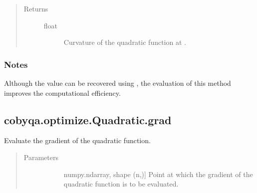 \documentclass[letterpaper,10pt,english]{sphinxmanual}
\begin{document}
\begin{fulllineitems}
\begin{fulllineitems}
\begin{quote}
\begin{description}
\begin{description}
\end{description}

\item[{Returns}] \leavevmode\begin{description}
\item[{float}] \leavevmode
\sphinxAtStartPar
Curvature of the quadratic function at .

\end{description}

\end{description}\end{quote}
\subsubsection*{Notes}

\sphinxAtStartPar
Although the value can be recovered using {\hyperref[\detokenize{refs/generated/cobyqa.optimize.Quadratic.hessp:cobyqa.optimize.Quadratic.hessp}]{}}, the evaluation of
this method improves the computational efficiency.

\end{fulllineitems}



\subsection{cobyqa.optimize.Quadratic.grad}
\label{\detokenize{refs/generated/cobyqa.optimize.Quadratic.grad:cobyqa-optimize-quadratic-grad}}\label{\detokenize{refs/generated/cobyqa.optimize.Quadratic.grad::doc}}

\begin{fulllineitems}
\label{\detokenize{refs/generated/cobyqa.optimize.Quadratic.grad:cobyqa.optimize.Quadratic.grad}}
\sphinxAtStartPar
Evaluate the gradient of the quadratic function.
\begin{quote}\begin{description}
\item[{Parameters}] \leavevmode\begin{description}
\item[{}] \leavevmode{[}numpy.ndarray, shape (n,){]}
\sphinxAtStartPar
Point at which the gradient of the quadratic function is to be
evaluated.


\end{description}
\end{description}
\end{quote}
\end{fulllineitems}
\end{fulllineitems}
\end{document}
